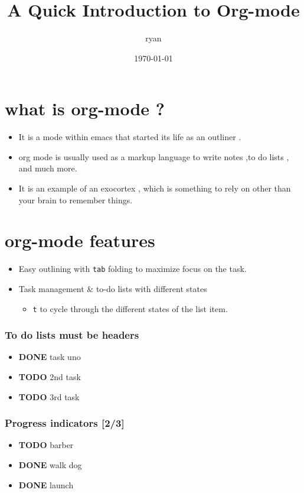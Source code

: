 \documentclass[11pt]{article}
\author{ryan}
\date{\today}
\title{A Quick Introduction to Org-mode}
\begin{document}
\maketitle
\tableofcontents

\section*{what is org-mode ?}
\label{sec:orgdec7fb4}
\begin{itemize}
\item It is a mode within emacs that started its life as an outliner .
\item org mode is usually used as a markup language to write notes ,to do lists , and much more.
\item It is an example of an exocortex , which is something to rely on other than your brain to remember things.
\end{itemize}
\section*{org-mode features}
\label{sec:org53d0999}
\begin{itemize}
\item Easy outlining with \texttt{tab} folding to maximize focus on the task.
\item Task management \& to-do lists with different states
\begin{itemize}
\item \texttt{t} to cycle through the different states of the list item.
\end{itemize}
\end{itemize}
\subsubsection*{To do lists must be headers}
\label{sec:org4e9d305}
\begin{itemize}
\item {\bfseries\sffamily DONE} task uno
\label{sec:orgf62d7a0}
\item {\bfseries\sffamily TODO} 2nd task
\label{sec:org7b27fd7}
\item {\bfseries\sffamily TODO} 3rd  task
\label{sec:org6842279}
\end{itemize}
\subsubsection*{Progress indicators [2/3]}
\label{sec:orge418c8f}
\begin{itemize}
\item {\bfseries\sffamily TODO} barber
\label{sec:orga622b64}
\item {\bfseries\sffamily DONE} walk dog
\label{sec:org72b6379}
\item {\bfseries\sffamily DONE} launch
\label{sec:org0999887}
\end{itemize}
\end{document}

